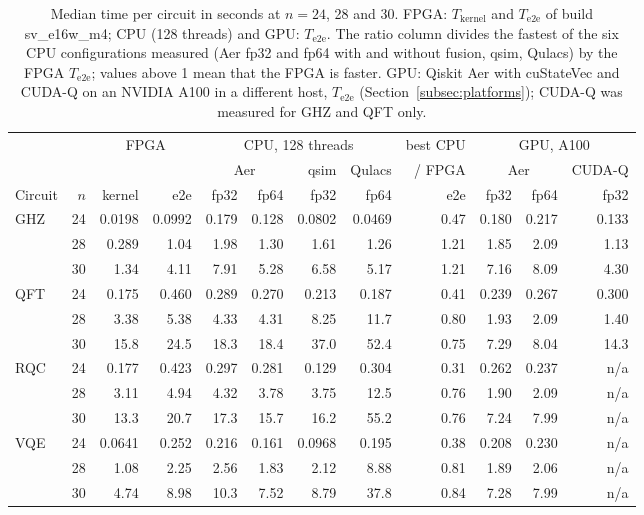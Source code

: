 \documentclass[pdflatex,sn-mathphys-num]{sn-jnl}
\theoremstyle{thmstyleone}
\theoremstyle{thmstylethree}
\begin{document}
\begin{table}
\centering
\caption{Median time per circuit in seconds at $n=24$, 28 and 30. FPGA: $T_\mathrm{kernel}$ and $T_\mathrm{e2e}$ of build sv\_e16w\_m4; CPU (128 threads) and GPU: $T_\mathrm{e2e}$. The ratio column divides the fastest of the six CPU configurations measured (Aer fp32 and fp64 with and without fusion, qsim, Qulacs) by the FPGA $T_\mathrm{e2e}$; values above 1 mean that the FPGA is faster. GPU: Qiskit Aer with cuStateVec and CUDA-Q on an NVIDIA A100 in a different host, $T_\mathrm{e2e}$ (Section~\ref{subsec:platforms}); CUDA-Q was measured for GHZ and QFT only.}\label{tab:xplat}
\footnotesize\setlength{\tabcolsep}{3pt}
\begin{tabular}{lrrrrrrrrrrr}
\toprule
 & & \multicolumn{2}{c}{FPGA} & \multicolumn{4}{c}{CPU, 128 threads} & best CPU & \multicolumn{3}{c}{GPU, A100} \\
\cmidrule(lr){3-4}\cmidrule(lr){5-8}\cmidrule(lr){10-12}
 & & & & \multicolumn{2}{c}{Aer} & qsim & Qulacs & / FPGA & \multicolumn{2}{c}{Aer} & CUDA-Q \\
Circuit & $n$ & kernel & e2e & fp32 & fp64 & fp32 & fp64 & e2e & fp32 & fp64 & fp32 \\
\midrule
GHZ & 24 & 0.0198 & 0.0992 & 0.179 & 0.128 & 0.0802 & 0.0469 & 0.47 & 0.180 & 0.217 & 0.133 \\
 & 28 & 0.289 & 1.04 & 1.98 & 1.30 & 1.61 & 1.26 & 1.21 & 1.85 & 2.09 & 1.13 \\
 & 30 & 1.34 & 4.11 & 7.91 & 5.28 & 6.58 & 5.17 & 1.21 & 7.16 & 8.09 & 4.30 \\
\addlinespace
QFT & 24 & 0.175 & 0.460 & 0.289 & 0.270 & 0.213 & 0.187 & 0.41 & 0.239 & 0.267 & 0.300 \\
 & 28 & 3.38 & 5.38 & 4.33 & 4.31 & 8.25 & 11.7 & 0.80 & 1.93 & 2.09 & 1.40 \\
 & 30 & 15.8 & 24.5 & 18.3 & 18.4 & 37.0 & 52.4 & 0.75 & 7.29 & 8.04 & 14.3 \\
\addlinespace
RQC & 24 & 0.177 & 0.423 & 0.297 & 0.281 & 0.129 & 0.304 & 0.31 & 0.262 & 0.237 & n/a \\
 & 28 & 3.11 & 4.94 & 4.32 & 3.78 & 3.75 & 12.5 & 0.76 & 1.90 & 2.09 & n/a \\
 & 30 & 13.3 & 20.7 & 17.3 & 15.7 & 16.2 & 55.2 & 0.76 & 7.24 & 7.99 & n/a \\
\addlinespace
VQE & 24 & 0.0641 & 0.252 & 0.216 & 0.161 & 0.0968 & 0.195 & 0.38 & 0.208 & 0.230 & n/a \\
 & 28 & 1.08 & 2.25 & 2.56 & 1.83 & 2.12 & 8.88 & 0.81 & 1.89 & 2.06 & n/a \\
 & 30 & 4.74 & 8.98 & 10.3 & 7.52 & 8.79 & 37.8 & 0.84 & 7.28 & 7.99 & n/a \\
\bottomrule
\end{tabular}
\end{table}
\end{document}
